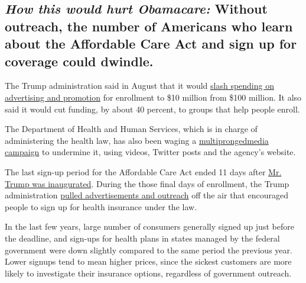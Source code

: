 \hypertarget{how-this-would-hurt-obamacare-without-outreach-the-number-of-americans-who-learn-about-the-affordable-care-act-and-sign-up-for-coverage-could-dwindle}{%
\subsection{\texorpdfstring{\emph{How this would hurt Obamacare:}
Without outreach, the number of Americans who learn about the Affordable
Care Act and sign up for coverage could
dwindle.}{How this would hurt Obamacare: Without outreach, the number of Americans who learn about the Affordable Care Act and sign up for coverage could dwindle.}}\label{how-this-would-hurt-obamacare-without-outreach-the-number-of-americans-who-learn-about-the-affordable-care-act-and-sign-up-for-coverage-could-dwindle}}

The Trump administration said in August that it would
\href{https://www.nytimes.com/2017/08/31/health/affordable-care-act-trump-spending.html}{slash
spending on advertising and promotion} for enrollment to \$10 million
from \$100 million. It also said it would cut funding, by about 40
percent, to groups that help people enroll.

The Department of Health and Human Services, which is in charge of
administering the health law, has also been waging a
\href{https://www.nytimes.com/interactive/2017/09/04/us/hhs-anti-obamacare-campaign.html?mcubz=0}{multipronged}\href{https://www.nytimes.com/interactive/2017/09/04/us/hhs-anti-obamacare-campaign.html?mcubz=0}{media
campaign} to undermine it, using videos, Twitter posts and the agency's
website.

The last sign-up period for the Affordable Care Act ended 11 days after
\href{https://www.nytimes.com/2017/01/20/us/politics/trump-inauguration-day.html}{Mr.
Trump was inaugurated}. During the those final days of enrollment, the
Trump administration
\href{https://www.nytimes.com/2017/01/26/us/politics/donald-trump-obamacare-ads.html?rref=collection\%2Fbyline\%2Frobert-pear\&action=click\&contentCollection=undefined\&region=stream\&module=stream_unit\&version=latest\&contentPlacement=5\&pgtype=collection}{pulled
advertisements and outreach} off the air that encouraged people to sign
up for health insurance under the law.

In the last few years, large number of consumers generally signed up
just before the deadline, and sign-ups for health plans in states
managed by the federal government were down slightly compared to the
same period the previous year. Lower signups tend to mean higher prices,
since the sickest customers are more likely to investigate their
insurance options, regardless of government outreach.

